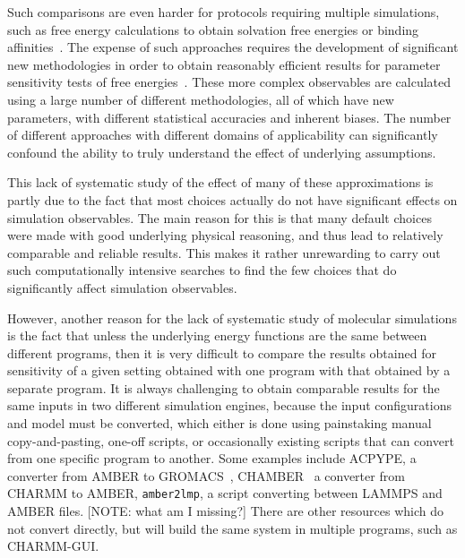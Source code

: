Such comparisons are even harder for protocols requiring multiple
simulations, such as free energy calculations to obtain solvation free
energies or binding affinities~\cite{???}.  The expense of such
approaches requires the development of significant new methodologies
in order to obtain reasonably efficient results for parameter
sensitivity tests of free energies~\cite{naden_rapid_2016}. These more
complex observables are calculated using a large number of different
methodologies, all of which have new parameters, with different
statistical accuracies and inherent biases. The number of different
approaches with different domains of applicability can significantly
confound the ability to truly understand the effect of underlying
assumptions.

This lack of systematic study of the effect of many of these
approximations is partly due to the fact that most choices actually do
not have significant effects on simulation observables. The main
reason for this is that many default choices were made with good
underlying physical reasoning, and thus lead to relatively comparable
and reliable results. This makes it rather unrewarding to carry out
such computationally intensive searches to find the few choices that
do significantly affect simulation observables.  

However, another reason for the lack of systematic study of molecular
simulations is the fact that unless the underlying energy functions
are the same between different programs, then it is very difficult to
compare the results obtained for sensitivity of a given setting
obtained with one program with that obtained by a separate program.
It is always challenging to obtain comparable results for the same inputs in two
different simulation engines, because the input
configurations and model must be converted, which either is done using
painstaking manual copy-and-pasting, one-off scripts, or occasionally
existing scripts that can convert from one specific program to
another.  Some examples include ACPYPE, a converter from AMBER to
GROMACS~\citep{sousa_da_silva_acpype_2012},
CHAMBER~\citep{crowley_chamber:_2009} a converter from CHARMM to
AMBER, {\tt amber2lmp}, a script converting between LAMMPS and AMBER
files. [NOTE: what am I missing?] There are other resources which do not convert directly, but
will build the same system in multiple programs, such as
CHARMM-GUI.~\citep{lee_charmm-gui_2016}

